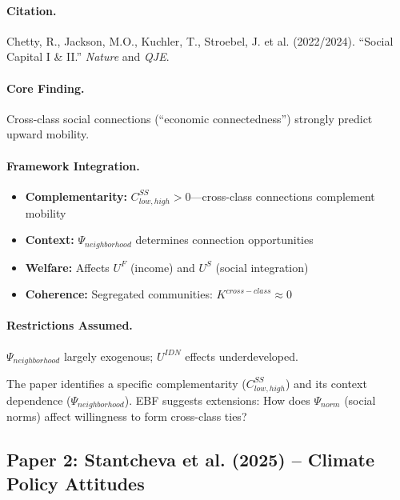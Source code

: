 \paragraph{Citation.}
Chetty, R., Jackson, M.O., Kuchler, T., Stroebel, J. et al. (2022/2024).
``Social Capital I \& II.'' \emph{Nature} and \emph{QJE}.

\paragraph{Core Finding.}
Cross-class social connections (``economic connectedness'') strongly predict
upward mobility.

\paragraph{Framework Integration.}
\begin{itemize}
  \item \textbf{Complementarity:} $C^{SS}_{low,high} > 0$---cross-class connections
        complement mobility
  \item \textbf{Context:} $\Psi_{neighborhood}$ determines connection opportunities
  \item \textbf{Welfare:} Affects $U^F$ (income) and $U^S$ (social integration)
  \item \textbf{Coherence:} Segregated communities: $K^{cross-class} \approx 0$
\end{itemize}

\paragraph{Restrictions Assumed.}
$\Psi_{neighborhood}$ largely exogenous; $U^{IDN}$ effects underdeveloped.

\begin{tcolorbox}[colback=yellow!5!white, colframe=yellow!75!black,
    title=EBF Insight: Chetty et al.]
The paper identifies a specific complementarity ($C^{SS}_{low,high}$) and its
context dependence ($\Psi_{neighborhood}$). EBF suggests extensions: How does
$\Psi_{norm}$ (social norms) affect willingness to form cross-class ties?
\end{tcolorbox}


\subsection{Paper 2: Stantcheva et al. (2025) -- Climate Policy Attitudes}

